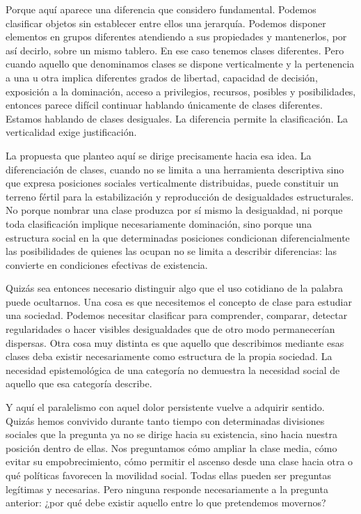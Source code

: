 \documentclass[12pt,a4paper]{article}
\begin{document}
Porque aquí aparece una diferencia que considero fundamental. Podemos clasificar objetos sin establecer entre ellos una jerarquía. Podemos disponer elementos en grupos diferentes atendiendo a sus propiedades y mantenerlos, por así decirlo, sobre un mismo tablero. En ese caso tenemos clases diferentes. Pero cuando aquello que denominamos clases se dispone verticalmente y la pertenencia a una u otra implica diferentes grados de libertad, capacidad de decisión, exposición a la dominación, acceso a privilegios, recursos, posibles y posibilidades, entonces parece difícil continuar hablando únicamente de clases diferentes. Estamos hablando de clases desiguales. La diferencia permite la clasificación. La verticalidad exige justificación.

La propuesta que planteo aquí se dirige precisamente hacia esa idea. La diferenciación de clases, cuando no se limita a una herramienta descriptiva sino que expresa posiciones sociales verticalmente distribuidas, puede constituir un terreno fértil para la estabilización y reproducción de desigualdades estructurales. No porque nombrar una clase produzca por sí mismo la desigualdad, ni porque toda clasificación implique necesariamente dominación, sino porque una estructura social en la que determinadas posiciones condicionan diferencialmente las posibilidades de quienes las ocupan no se limita a describir diferencias: las convierte en condiciones efectivas de existencia.

Quizás sea entonces necesario distinguir algo que el uso cotidiano de la palabra puede ocultarnos. Una cosa es que necesitemos el concepto de clase para estudiar una sociedad. Podemos necesitar clasificar para comprender, comparar, detectar regularidades o hacer visibles desigualdades que de otro modo permanecerían dispersas. Otra cosa muy distinta es que aquello que describimos mediante esas clases deba existir necesariamente como estructura de la propia sociedad. La necesidad epistemológica de una categoría no demuestra la necesidad social de aquello que esa categoría describe.

Y aquí el paralelismo con aquel dolor persistente vuelve a adquirir sentido. Quizás hemos convivido durante tanto tiempo con determinadas divisiones sociales que la pregunta ya no se dirige hacia su existencia, sino hacia nuestra posición dentro de ellas. Nos preguntamos cómo ampliar la clase media, cómo evitar su empobrecimiento, cómo permitir el ascenso desde una clase hacia otra o qué políticas favorecen la movilidad social. Todas ellas pueden ser preguntas legítimas y necesarias. Pero ninguna responde necesariamente a la pregunta anterior: ¿por qué debe existir aquello entre lo que pretendemos movernos?
\end{document}
